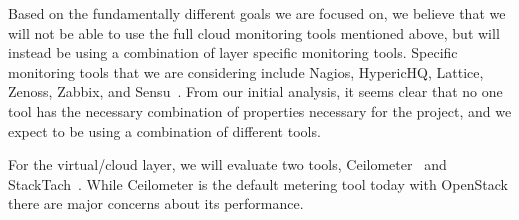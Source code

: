 Based on the fundamentally different goals we are focused on, we believe that we will not be able to use the full cloud monitoring tools mentioned above, but will instead be using a combination of layer specific monitoring tools.  Specific monitoring tools that we are considering include Nagios, HypericHQ, Lattice, Zenoss, Zabbix, and Sensu~\cite{sandoval2012evaluation,Aceto2013}.  From our initial analysis, it seems clear that no one tool has the necessary combination of properties necessary for the project, and we expect to be using a combination of different tools. 

For the virtual/cloud layer, we will evaluate two tools, Ceilometer~\cite{ceilometer} and  StackTach~\cite{stacktach}. While Ceilometer is the default metering tool today with OpenStack there are major concerns about its performance. 